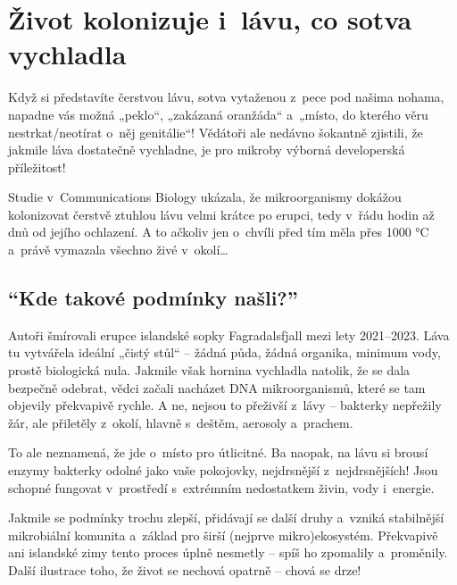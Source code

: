 \documentclass[main.tex]{subfiles}
\begin{document}
\section{Život kolonizuje i~lávu, co sotva vychladla}
Když si představíte čerstvou lávu, sotva vytaženou z~pece pod našima nohama, napadne vás možná „peklo“, „zakázaná oranžáda“ a~„místo, do kterého věru nestrkat/neotírat o~něj genitálie“! Vědátoři ale nedávno šokantně zjistili, že jakmile láva dostatečně vychladne, je pro mikroby výborná developerská příležitost!\par
Studie v~Communications Biology ukázala, že mikroorganismy dokážou kolonizovat čerstvě ztuhlou lávu velmi krátce po erupci, tedy v~řádu hodin až dnů od jejího ochlazení. A to ačkoliv jen o~chvíli před tím měla přes 1000 °C a~právě vymazala všechno živé v~okolí…
\subsection*{\enquote{Kde takové podmínky našli?}}
Autoři šmírovali erupce islandské sopky Fagradalsfjall mezi lety 2021–2023. Láva tu vytvářela ideální „čistý stůl“ – žádná půda, žádná organika, minimum vody, prostě biologická nula. Jakmile však hornina vychladla natolik, že se dala bezpečně odebrat, vědci začali nacházet DNA mikroorganismů, které se tam objevily překvapivě rychle. A ne, nejsou to přeživší z~lávy – bakterky nepřežily žár, ale přiletěly z~okolí, hlavně s~deštěm, aerosoly a~prachem.\par
To ale neznamená, že jde o~místo pro útlicitné. Ba naopak, na lávu si brousí enzymy bakterky odolné jako vaše pokojovky, nejdrsnější z~nejdrsnějších! Jsou schopné fungovat v~prostředí s~extrémním nedostatkem živin, vody i~energie.\par Jakmile se podmínky trochu zlepší, přidávají se další druhy a~vzniká stabilnější mikrobiální komunita a~základ pro širší (nejprve mikro)ekosystém. Překvapivě ani islandské zimy tento proces úplně nesmetly – spíš ho zpomalily a~proměnily. Další ilustrace toho, že život se nechová opatrně – chová se drze!
\end{document}
